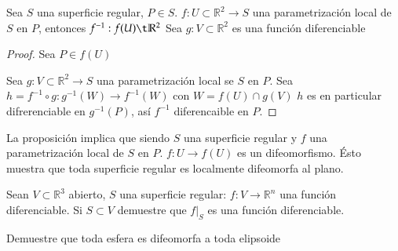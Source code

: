 \begin{proposition}
  Sea $S$ una superficie regular, $P \in S$. $f: U \subset \mathbb{R}^2 \to S$
  una parametrización local de $S$ en $P$, entonces $f^{-1}:f(U) \t \mathbb{R}^2$  
  Sea $g: V \subset \mathbb{R}^2$ es una función diferenciable

\end{proposition}
\begin{proof}
  Sea $P \in f(U)$

  Sea $g: V \subset \mathbb{R}^2 \to S$ una parametrización local se $S$ en $P$.
  Sea $h = f^{-1} \circ g: g^{-1}(W) \to f^{-1}(W)$ con $W= f(U) \cap g(V)$ $h$
  es en particular difrerenciable en $g^{-1}(P)$, así $f^{-1}$ diferencaible en
  $P$.

\end{proof}
La proposición implica que siendo $S$ una superficie regular y $f$ una
parametrización local de $S$ en $P$. $f: U \to f(U)$ es un difeomorfismo. Ésto
muestra que toda superficie regular es localmente difeomorfa al plano.

\begin{problem}
  Sean $V \subset \mathbb{R}^3$ abierto, $S$ una superficie regular:
  $f:V \to \mathbb{R}^n$ una función diferenciable.
  Si $S \subset V$ demuestre que $f|_S$ es una función diferenciable.

\end{problem}
\begin{problem}
  Demuestre que toda esfera es difeomorfa a toda elipsoide

\end{problem}
